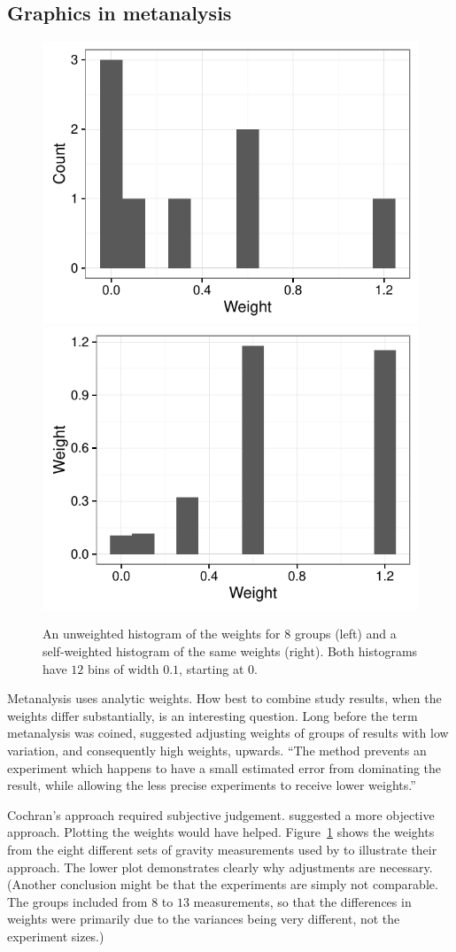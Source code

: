 \documentclass{svmult}
\begin{document}
\subsection{Graphics in metanalysis}
\label{meta}

\begin{figure}[htbp]
  \centering
  \includegraphics[width=0.5\linewidth]{meta}%
  \includegraphics[width=0.5\linewidth]{meta-weighted}
  \caption{An unweighted histogram of the weights for $8$ groups (left) and a self-weighted histogram of the same weights (right).  Both histograms have $12$ bins of width $0.1$, starting at $0$.}
  \label{hc} 
\end{figure}

Metanalysis uses analytic weights.  How best to combine study results, when the weights differ substantially, is an interesting question.  Long before the term metanalysis was coined, \cite{cochran:1954b} suggested adjusting weights of groups of results with low variation, and consequently high weights, upwards.  ``The method prevents an experiment which happens to have a small estimated error from dominating the result, while allowing the less precise experiments to receive lower weights.''

Cochran's approach required subjective judgement.  \cite{mosteller:1982} suggested a more objective approach.  Plotting the weights would have helped.  Figure~\ref{hc} shows the weights from the eight different sets of gravity measurements used by \cite{mosteller:1982} to illustrate their approach.  The lower plot demonstrates clearly why adjustments are necessary.  (Another conclusion might be that the experiments are simply not comparable.  The groups included from $8$ to $13$ measurements, so that the differences in weights were primarily due to the variances being very different, not the experiment sizes.)
\end{document}
